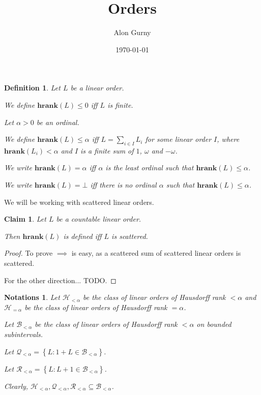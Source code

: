 \documentclass{article}
\author{Alon Gurny}
\title{Orders}
\date{\today}
\newtheorem{claim}{Claim}
\newtheorem{definition}{Definition}
\newtheorem{notations}{Notations}
\newcommand{\braces}[1]{\left\{ {#1} \right\}}
\newcommand{\setcomp}[1]{\braces{#1}}
\newcommand{\hrank}[1]{\mathbf{hrank}\left( #1 \right)}
\newcommand{\agemo}{-\omega}
\begin{document}
\maketitle

\begin{definition}
  Let $L$ be a linear order.

  We define $\hrank{L} \le 0$ iff $L$ is finite.

  Let $\alpha > 0$ be an ordinal.

  We define $\hrank{L} \le \alpha$
  iff $L = \sum_{i \in I} L_i$ for some linear order $I$,
  where $\hrank{L_i} < \alpha$ and $I$ is a finite sum of $1$, $\omega$ and
  $\agemo$.

  We write $\hrank{L} = \alpha$ iff $\alpha$ is the
  least ordinal such that $\hrank{L} \le \alpha$.

  We write $\hrank{L} = \bot$ iff there is no ordinal $\alpha$ such that
  $\hrank{L} \le \alpha$.
\end{definition}

We will be working with scattered linear orders.

\begin{claim}
  Let $L$ be a countable linear order.

  Then $\hrank{L}$ is defined iff $L$ is scattered.
\end{claim}

\begin{proof}
  To prove $\implies$ is easy, as a scattered sum of scattered linear orders is scattered.

  For the other direction... TODO.
\end{proof}

\begin{notations}
  Let $\mathcal{H}_{< \alpha}$ be the class of linear orders of Hausdorff rank
  $< \alpha$ and $\mathcal{H}_{=\alpha}$ be the class of linear orders of
  Hausdorff rank $= \alpha$.

  Let $\mathcal{B}_{< \alpha}$ be the class of linear orders
  of Hausdorff rank $< \alpha$ on bounded subintervals.

  Let $\mathcal{Q}_{< \alpha} = \setcomp{L : 1 + L \in \mathcal{B}_{< \alpha}}$.

  Let $\mathcal{R}_{< \alpha} = \setcomp{L : L + 1 \in \mathcal{B}_{< \alpha}}$.

  Clearly,
  $\mathcal{H}_{< \alpha}, \mathcal{Q}_{< \alpha}, \mathcal{R}_{< \alpha} \subseteq \mathcal{B}_{< \alpha}$.
\end{notations}
\end{document}
